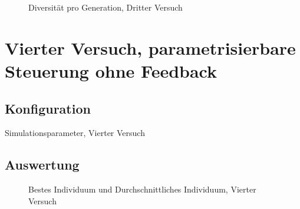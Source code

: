           \begin{figure}
            \centering
            
            \caption{Diversität pro Generation, Dritter Versuch\label{fig:graphDivThird}}
          \end{figure}

      \section{Vierter Versuch, parametrisierbare Steuerung ohne Feedback}

        \subsection{Konfiguration}

          \begin{table}[H]
            \centering
            
            \caption{Simulationsparameter, Vierter Versuch \label{tbl:forthRunConf}}
          \end{table}

        \subsection{Auswertung}

          \begin{figure}[H]
            \centering
            
            \caption{Bestes Individuum und Durchschnittliches Individuum, Vierter Versuch\label{fig:graphFourth}}
          \end{figure}

